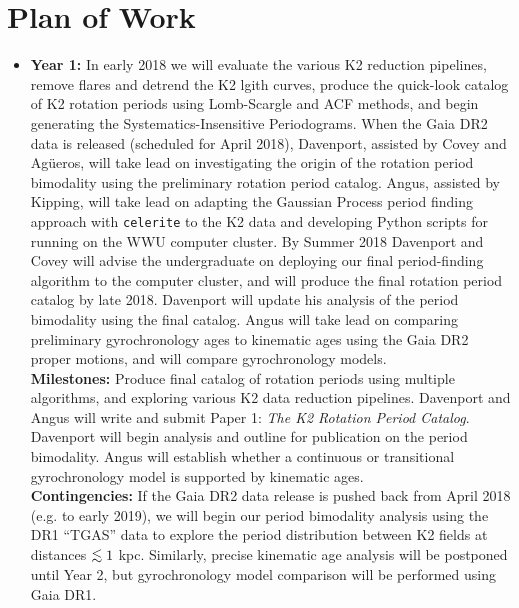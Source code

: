 \documentclass[12pt]{article}
\def\lesssim{\mathrel{\hbox{\rlap{\hbox{\lower3pt\hbox{$\sim$}}}\hbox{\raise2pt\hbox{$<$}}}}}
\begin{document}
\section{Plan of Work}

\begin{itemize}
\item {\bf Year 1:} In early 2018 we will evaluate the various K2 reduction pipelines, remove flares and detrend the K2 lgith curves, produce the quick-look catalog of K2 rotation periods using Lomb-Scargle and ACF methods, and begin generating the Systematics-Insensitive Periodograms. When the Gaia DR2 data is released (scheduled for April 2018), Davenport, assisted by Covey and Ag\"{u}eros, will take lead on investigating the origin of the rotation period bimodality using the preliminary rotation period catalog. 
Angus, assisted by Kipping, will take lead on adapting the Gaussian Process period finding approach with {\tt celerite} to the K2 data and developing Python scripts for running on the WWU computer cluster. 
By Summer 2018 Davenport and Covey will advise the undergraduate on deploying our final period-finding algorithm to the computer cluster, and will produce the final rotation period catalog by late 2018. 
Davenport will update his analysis of the period bimodality using the final catalog.
Angus will take lead on comparing preliminary gyrochronology ages to kinematic ages using the Gaia DR2 proper motions, and will compare gyrochronology models.
\\
{\bf Milestones:} Produce final catalog of rotation periods using multiple algorithms, and exploring various K2 data reduction pipelines. Davenport and Angus will write and submit Paper 1: {\it The K2 Rotation Period Catalog}. Davenport will begin analysis and outline for publication on the period bimodality. 
        Angus will establish whether a continuous or transitional gyrochronology model is
        supported by kinematic ages.
\\
{\bf Contingencies:} If the Gaia DR2 data release is pushed back from April 2018 (e.g. to early 2019), we will begin our period bimodality analysis using the DR1 ``TGAS'' data to explore the period distribution between K2 fields at distances $\lesssim 1$ kpc. Similarly, precise kinematic age analysis will be postponed until Year 2, but gyrochronology model comparison will be performed using Gaia DR1.

\end{itemize}
\end{document}
